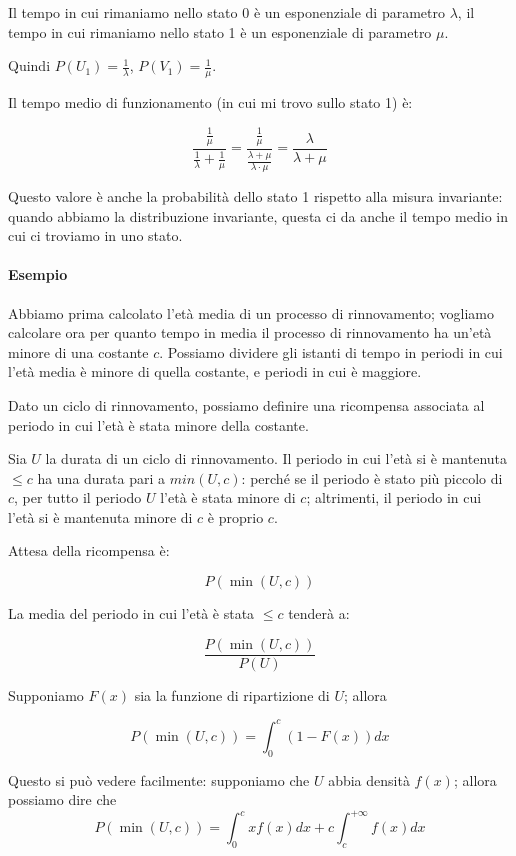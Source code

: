 \documentclass[a4paper,12pt]{book}
\begin{document}
Il tempo in cui rimaniamo nello stato 0 è un esponenziale di parametro $\lambda$, il tempo in cui rimaniamo nello stato 1 è un esponenziale di parametro $ \mu $. 

Quindi $ P(U_1) = \frac{1}{\lambda}$, $ P(V_1) = \frac{1}{\mu} $.

Il tempo medio di funzionamento (in cui mi trovo sullo stato 1) è:

$$ \frac{\frac{1}{\mu}}{\frac{1}{\lambda} + \frac{1}{\mu}} = \frac{\frac{1}{\mu}}{\frac{\lambda + \mu}{\lambda \cdot \mu}} = \frac{\lambda}{\lambda + \mu} $$

Questo valore è anche la probabilità dello stato 1 rispetto alla misura invariante: quando abbiamo la distribuzione invariante, questa ci da anche il tempo medio in cui ci troviamo in uno stato. 

\paragraph{Esempio}
Abbiamo prima calcolato l'età media di un processo di rinnovamento; vogliamo calcolare ora per quanto tempo in media il processo di rinnovamento ha un'età minore di una costante $ c $. 
Possiamo dividere gli istanti di tempo in periodi in cui l'età media è minore di quella costante, e periodi in cui è maggiore.

Dato un ciclo di rinnovamento, possiamo definire una ricompensa associata al periodo in cui l'età è stata minore della costante. 

Sia $ U $ la durata di un ciclo di rinnovamento. Il periodo in cui l'età si è mantenuta $ \le c $  ha una durata pari a $ min(U,c) $: perché se il periodo è stato più piccolo di $ c $, per tutto il periodo $ U $ l'età è stata minore di $ c $; altrimenti, il periodo in cui l'età si è mantenuta minore di $ c $ è proprio $ c $. 

Attesa della ricompensa è:

$$ P(\min(U,c)) $$

La media del periodo in cui l'età è stata $ \le c $ tenderà a:

$$ \frac{P(\min(U,c))}{P(U)} $$

Supponiamo $ F(x) $ sia la funzione di ripartizione di $ U $; allora 

$$ P(\min(U,c)) = \int_{0}^{c} (1 - F(x))dx$$ 

Questo si può vedere facilmente: supponiamo che $ U $ abbia densità $ f(x) $; allora possiamo dire che
$$ P(\min(U,c)) = \int_{0}^{c} xf(x)dx + c\int_{c}^{+\infty} f(x) dx $$
\end{document}
